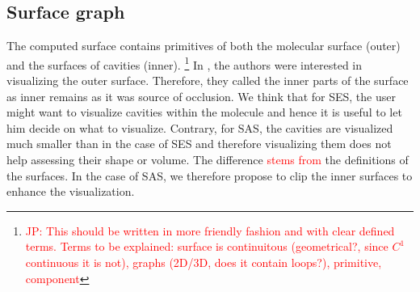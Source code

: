 \subsection{Surface graph}
\label{sec:graph}
   

The computed surface contains primitives of both the molecular surface (outer) and the surfaces of cavities (inner).
\footnote{\textcolor{red}{JP: This should be written in more friendly fashion and with clear defined terms.
Terms to be explained: surface is continuitous (geometrical?, since $C^1$ continuous it is not), graphs (2D/3D, does it contain loops?), primitive, component}}
In \cite{kauker2013rendering}, the authors were interested in visualizing the outer surface.
Therefore, they called the inner parts of the surface as inner remains as it was source of occlusion.
We think that for SES, the user might want to visualize cavities within the molecule and hence it is useful to let him decide on what to visualize.
Contrary, for SAS, the cavities are visualized much smaller than in the case of SES and therefore visualizing them does not help assessing their shape or volume.
The difference \textcolor{red}{stems from} the definitions of the surfaces.
In the case of SAS, we therefore propose to clip the inner surfaces to enhance the visualization.

